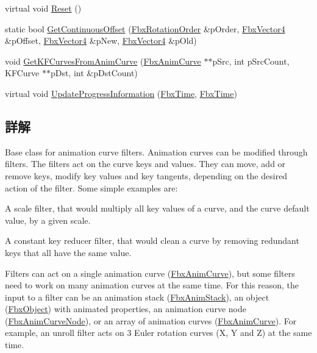 \begin{DoxyCompactItemize}
\item 
virtual void \hyperlink{class_fbx_anim_curve_filter_a57fb35baaaa85adb08946383cf40e811}{Reset} ()
\item 
static bool \hyperlink{class_fbx_anim_curve_filter_a6aa65cd224b35635b02d842b2c72692e}{Get\+Continuous\+Offset} (\hyperlink{class_fbx_rotation_order}{Fbx\+Rotation\+Order} \&p\+Order, \hyperlink{class_fbx_vector4}{Fbx\+Vector4} \&p\+Offset, \hyperlink{class_fbx_vector4}{Fbx\+Vector4} \&p\+New, \hyperlink{class_fbx_vector4}{Fbx\+Vector4} \&p\+Old)
\item 
void \hyperlink{class_fbx_anim_curve_filter_aa5aafb34a738b03619cdf426eb9b4089}{Get\+K\+F\+Curves\+From\+Anim\+Curve} (\hyperlink{class_fbx_anim_curve}{Fbx\+Anim\+Curve} $\ast$$\ast$p\+Src, int p\+Src\+Count, K\+F\+Curve $\ast$$\ast$p\+Dst, int \&p\+Dst\+Count)
\item 
virtual void \hyperlink{class_fbx_anim_curve_filter_ac9403f06db2fd928f29d68d755a26c1b}{Update\+Progress\+Information} (\hyperlink{class_fbx_time}{Fbx\+Time}, \hyperlink{class_fbx_time}{Fbx\+Time})
\end{DoxyCompactItemize}


\subsection{詳解}
Base class for animation curve filters. Animation curves can be modified through filters. The filters act on the curve keys and values. They can move, add or remove keys, modify key values and key tangents, depending on the desired action of the filter. Some simple examples are\+: \begin{DoxyItemize}
\item A scale filter, that would multiply all key values of a curve, and the curve default value, by a given scale. \item A constant key reducer filter, that would clean a curve by removing redundant keys that all have the same value.\end{DoxyItemize}
Filters can act on a single animation curve (\hyperlink{class_fbx_anim_curve}{Fbx\+Anim\+Curve}), but some filters need to work on many animation curves at the same time. For this reason, the input to a filter can be an animation stack (\hyperlink{class_fbx_anim_stack}{Fbx\+Anim\+Stack}), an object (\hyperlink{class_fbx_object}{Fbx\+Object}) with animated properties, an animation curve node (\hyperlink{class_fbx_anim_curve_node}{Fbx\+Anim\+Curve\+Node}), or an array of animation curves (\hyperlink{class_fbx_anim_curve}{Fbx\+Anim\+Curve}). For example, an unroll filter acts on 3 Euler rotation curves (X, Y and Z) at the same time.

